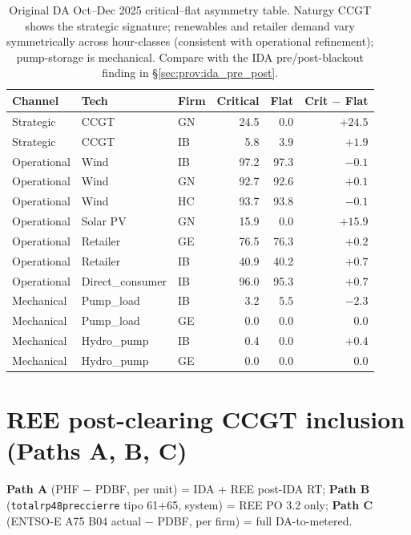 \documentclass[11pt,a4paper]{article}
\begin{document}
\begin{table}[H]
\centering
\caption{Original DA Oct--Dec 2025 critical--flat asymmetry table. Naturgy CCGT shows the strategic signature; renewables and retailer demand vary symmetrically across hour-classes (consistent with operational refinement); pump-storage is mechanical. Compare with the IDA pre/post-blackout finding in §\ref{sec:prov:ida_pre_post}.}
\label{tab:prov:operational_strategic_asym}
\begin{tabular}{l l l r r r}
\toprule
Channel & Tech & Firm & Critical & Flat & Crit $-$ Flat \\
\midrule
Strategic       & CCGT      & GN & 24.5 &  0.0 & $+24.5$ \\
Strategic       & CCGT      & IB &  5.8 &  3.9 & $+1.9$ \\
\addlinespace
Operational     & Wind      & IB & 97.2 & 97.3 & $-0.1$ \\
Operational     & Wind      & GN & 92.7 & 92.6 & $+0.1$ \\
Operational     & Wind      & HC & 93.7 & 93.8 & $-0.1$ \\
Operational     & Solar PV  & GN & 15.9 &  0.0 & $+15.9$ \\
Operational     & Retailer  & GE & 76.5 & 76.3 & $+0.2$ \\
Operational     & Retailer  & IB & 40.9 & 40.2 & $+0.7$ \\
Operational     & Direct\_consumer & IB & 96.0 & 95.3 & $+0.7$ \\
\addlinespace
Mechanical      & Pump\_load   & IB &  3.2 &  5.5 & $-2.3$ \\
Mechanical      & Pump\_load   & GE &  0.0 &  0.0 & $0.0$ \\
Mechanical      & Hydro\_pump  & IB &  0.4 &  0.0 & $+0.4$ \\
Mechanical      & Hydro\_pump  & GE &  0.0 &  0.0 & $0.0$ \\
\bottomrule
\end{tabular}
\end{table}


\section{REE post-clearing CCGT inclusion (Paths A, B, C)}\label{sec:prov:phf_minus_pdbf}

\textbf{Path A} (PHF $-$ PDBF, per unit) = IDA + REE post-IDA RT; \textbf{Path B} (\texttt{totalrp48preccierre} tipo 61$+$65, system) = REE PO 3.2 only; \textbf{Path C} (ENTSO-E A75 B04 actual $-$ PDBF, per firm) = full DA-to-metered.
\end{document}
